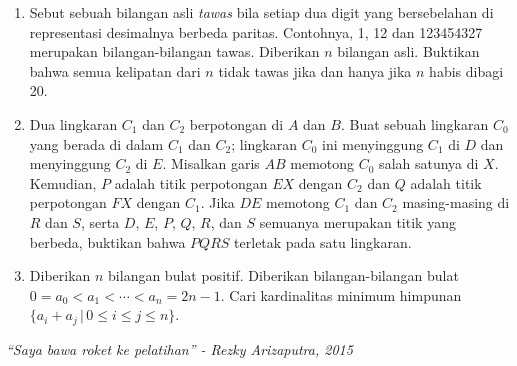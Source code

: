 \documentclass{article}
\begin{document}
	\begin{enumerate}
		\item Sebut sebuah bilangan asli \textit{tawas} bila setiap dua digit yang bersebelahan di representasi desimalnya berbeda paritas. Contohnya, 1, 12 dan 123454327 merupakan bilangan-bilangan tawas. Diberikan $n$ bilangan asli. Buktikan bahwa semua kelipatan dari $n$ tidak tawas jika dan hanya jika $n$ habis dibagi 20.
		\item Dua lingkaran $C_1$ dan $C_2$ berpotongan di $A$ dan $B$. Buat sebuah lingkaran $C_0$ yang berada di dalam $C_1$ dan $C_2$; lingkaran $C_0$ ini menyinggung $C_1$ di $D$ dan menyinggung $C_2$ di $E$. Misalkan garis $AB$ memotong $C_0$ salah satunya di $X$. Kemudian, $P$ adalah titik perpotongan $EX$ dengan $C_2$ dan $Q$ adalah titik perpotongan $FX$ dengan $C_1$. Jika $DE$ memotong $C_1$ dan $C_2$ masing-masing di $R$ dan $S$, serta $D$, $E$, $P$, $Q$, $R$, dan $S$ semuanya merupakan titik yang berbeda, buktikan bahwa $PQRS$ terletak pada satu lingkaran.
		\item Diberikan $n$ bilangan bulat positif. Diberikan bilangan-bilangan bulat $0 = a_0 < a_1 < \dotsb < a_n = 2n - 1$. Cari kardinalitas minimum himpunan $\{ a_i + a_j \, | \, 0 \le i \le j \le n \}$.
	\end{enumerate}
	\begin{center}
		\textit{``Saya bawa roket ke pelatihan'' - Rezky Arizaputra, 2015}
	\end{center}
\end{document}
